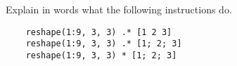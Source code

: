 \begin{task}
    Explain in words what the following instructions do.
    \begin{verbatim}
    reshape(1:9, 3, 3) .* [1 2 3]
    reshape(1:9, 3, 3) .* [1; 2; 3]
    reshape(1:9, 3, 3) * [1; 2; 3]
    \end{verbatim}
\end{task}

